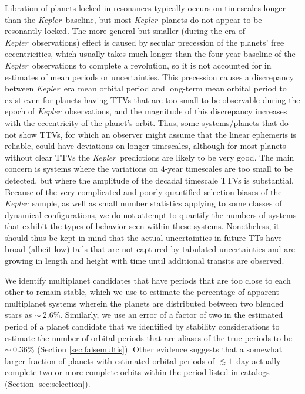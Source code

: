 \documentclass{aastex62}
\newcommand{\ik}{{\it Kepler~}}
\begin{document}
Libration of planets locked in resonances typically occurs on timescales longer than the \ik baseline, but most \ik planets do not appear to be resonantly-locked. The more general but smaller (during the era of \ik observations) effect is caused by secular precession of the planets' free eccentricities, which usually takes much longer than the four-year baseline of the \ik observations to complete a revolution, so it is not accounted for in estimates of mean periods or uncertainties.  This precession causes a discrepancy between \ik era mean orbital period and long-term mean orbital period to exist even for planets having TTVs that are too small to be observable during the epoch of \ik observations, and the magnitude of this discrepancy increases with the eccentricity of the planet's orbit. Thus, some systems/planets that do not show TTVs, for which an observer might assume that the linear ephemeris is reliable, could have deviations on longer timescales, although for most planets without clear TTVs the \ik predictions are likely to be very good. The main concern is systems where the variations on 4-year timescales are too small to be detected, but where the amplitude of the decadal timescale TTVs is substantial. {Because of the very complicated and poorly-quantified selection biases of the \ik sample, as well as small number statistics applying to some classes of dynamical configurations, we do not attempt to quantify the numbers of systems that exhibit the types of behavior seen within these systems.}
 Nonetheless, it should thus be kept in mind that the actual uncertainties in future TTs have broad (albeit low) tails that are not captured by tabulated uncertainties and are growing in length and height with time until additional transits are observed.

{We identify multiplanet candidates that have periods that are too close to each other to remain stable, which we use 
to estimate the percentage of apparent multiplanet systems wherein the planets are distributed  between two blended stars as $\sim~2.6\%$. Similarly, we use an error of a factor of two in the estimated period of a planet candidate that we identified by stability considerations to estimate the number of orbital periods that are aliases of the true periods to be $\sim~0.36\%$ (Section \ref{sec:falsemultis}). Other evidence suggests that a somewhat larger fraction of planets with estimated orbital periods of $\lesssim 1$~day actually complete two or more complete orbits within the period listed in catalogs (Section \ref{sec:selection}).} 
\end{document}
